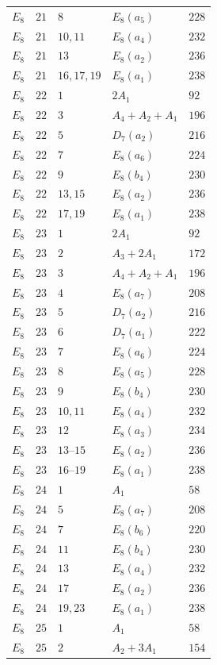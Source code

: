 \documentclass[11pt,a4paper]{amsart}
\numberwithin{equation}{section}
\theoremstyle{definition}
\theoremstyle{remark}
\begin{document}
{\begin{longtable}{@{}p{}p{}p{}p{}p{}@{}}
$E_{8}$&$21$&$8$&$E_{8}(a_{5})$&$228$\\
$E_{8}$&$21$&$10,11$&$E_{8}(a_{4})$&$232$\\
$E_{8}$&$21$&$13$&$E_{8}(a_{2})$&$236$\\
$E_{8}$&$21$&$16,17,19$&$E_{8}(a_{1})$&$238$\\
$E_{8}$&$22$&$1$&$2A_{1}$&$92$\\
$E_{8}$&$22$&$3$&$A_{4}+A_{2}+A_{1}$&$196$\\
$E_{8}$&$22$&$5$&$D_{7}(a_{2})$&$216$\\
$E_{8}$&$22$&$7$&$E_{8}(a_{6})$&$224$\\
$E_{8}$&$22$&$9$&$E_{8}(b_{4})$&$230$\\
$E_{8}$&$22$&$13,15$&$E_{8}(a_{2})$&$236$\\
$E_{8}$&$22$&$17,19$&$E_{8}(a_{1})$&$238$\\
$E_{8}$&$23$&$1$&$2A_{1}$&$92$\\
$E_{8}$&$23$&$2$&$A_{3}+2A_{1}$&$172$\\
$E_{8}$&$23$&$3$&$A_{4}+A_{2}+A_{1}$&$196$\\
$E_{8}$&$23$&$4$&$E_{8}(a_{7})$&$208$\\
$E_{8}$&$23$&$5$&$D_{7}(a_{2})$&$216$\\
$E_{8}$&$23$&$6$&$D_{7}(a_{1})$&$222$\\
$E_{8}$&$23$&$7$&$E_{8}(a_{6})$&$224$\\
$E_{8}$&$23$&$8$&$E_{8}(a_{5})$&$228$\\
$E_{8}$&$23$&$9$&$E_{8}(b_{4})$&$230$\\
$E_{8}$&$23$&$10,11$&$E_{8}(a_{4})$&$232$\\
$E_{8}$&$23$&$12$&$E_{8}(a_{3})$&$234$\\
$E_{8}$&$23$&$13\text{--}15$&$E_{8}(a_{2})$&$236$\\
$E_{8}$&$23$&$16\text{--}19$&$E_{8}(a_{1})$&$238$\\
$E_{8}$&$24$&$1$&$A_{1}$&$58$\\
$E_{8}$&$24$&$5$&$E_{8}(a_{7})$&$208$\\
$E_{8}$&$24$&$7$&$E_{8}(b_{6})$&$220$\\
$E_{8}$&$24$&$11$&$E_{8}(b_{4})$&$230$\\
$E_{8}$&$24$&$13$&$E_{8}(a_{4})$&$232$\\
$E_{8}$&$24$&$17$&$E_{8}(a_{2})$&$236$\\
$E_{8}$&$24$&$19,23$&$E_{8}(a_{1})$&$238$\\
$E_{8}$&$25$&$1$&$A_{1}$&$58$\\
$E_{8}$&$25$&$2$&$A_{2}+3A_{1}$&$154$\\

\end{longtable}}
\end{document}
